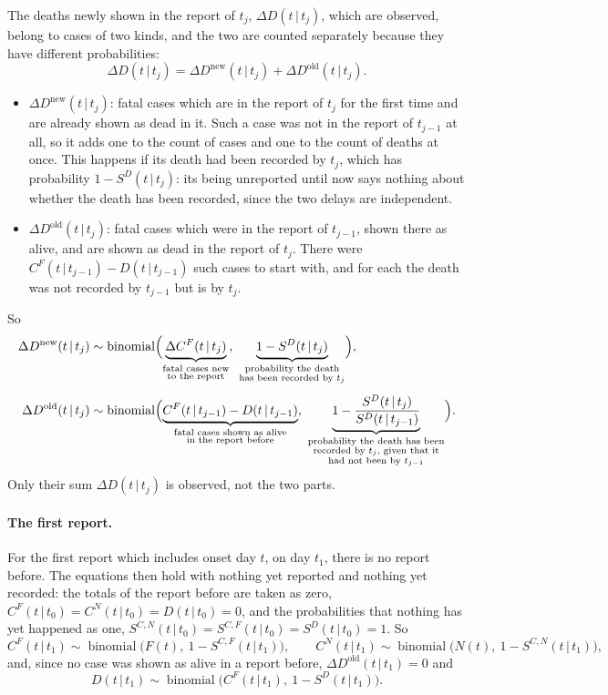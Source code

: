 \documentclass[11pt,a4paper]{article}
\newcommand{\given}{\,|\,}
\newcommand{\bin}{\operatorname{binomial}}
\newcommand{\dnew}{\Delta D^{\mathrm{new}}}
\newcommand{\dold}{\Delta D^{\mathrm{old}}}
\begin{document}
The deaths newly shown in the report of $t_j$, $\Delta D(t\given t_j)$,
which are observed, belong to cases of two kinds, and the two are counted separately because
they have different probabilities:
\[
\Delta D(t\given t_j)=\dnew(t\given t_j)+\dold(t\given t_j).
\]
\begin{itemize}
\item $\dnew(t\given t_j)$: fatal cases which are in the report of $t_j$ for
the first time and are already shown as dead in it. Such a case was not in
the report of $t_{j-1}$ at all, so it adds one to the count of cases and one
to the count of deaths at once. This happens if its death had been recorded
by $t_j$, which has probability $1-S^{D}(t\given t_j)$: its being
unreported until now says nothing about whether the death has been recorded,
since the two delays are independent.
\item $\dold(t\given t_j)$: fatal cases which were in the report of
$t_{j-1}$, shown there as alive, and are shown as dead in the report of
$t_j$. There were $C^{F}(t\given t_{j-1})-D(t\given t_{j-1})$ such cases to
start with, and for each the death was not recorded by $t_{j-1}$ but is by
$t_j$.
\end{itemize}
So
\begin{align}
\dnew(t\given t_j) &\sim\bin\Bigl(
 \underbrace{\Delta C^{F}(t\given t_j)}_{\substack{\text{fatal cases new}\\ \text{to the report}}},\
 \underbrace{1-S^{D}(t\given t_j)}_{\substack{\text{probability the death}\\ \text{has been recorded by } t_j}}
 \Bigr),
 \label{eq:x}\\[1ex]
\dold(t\given t_j) &\sim\bin\Bigl(
 \underbrace{C^{F}(t\given t_{j-1})-D(t\given t_{j-1})}_{\substack{\text{fatal cases shown as alive}\\ \text{in the report before}}},\
 \underbrace{1-\frac{S^{D}(t\given t_j)}{S^{D}(t\given t_{j-1})}}_{\substack{\text{probability the death has been}\\ \text{recorded by } t_j \text{, given that it}\\ \text{had not been by } t_{j-1}}}
 \Bigr).
 \label{eq:y}
\end{align}
Only their sum $\Delta D(t\given t_j)$ is observed, not the two parts.

\paragraph{The first report.} For the first report which includes onset day
$t$, on day $t_1$, there is no report before. The equations then hold with
nothing yet reported and nothing yet recorded: the totals of the report
before are taken as zero,
$C^{F}(t\given t_0)=C^{N}(t\given t_0)=D(t\given t_0)=0$, and the
probabilities that nothing has yet happened as one,
$S^{C,N}(t\given t_0)=S^{C,F}(t\given t_0)=S^{D}(t\given t_0)=1$. So
\[
C^{F}(t\given t_1)\sim\bin\bigl(F(t),\ 1-S^{C,F}(t\given t_1)\bigr),\qquad
C^{N}(t\given t_1)\sim\bin\bigl(N(t),\ 1-S^{C,N}(t\given t_1)\bigr),
\]
and, since no case was shown as alive in a report before,
$\Delta D^{\mathrm{old}}(t\given t_1)=0$ and
\[
D(t\given t_1)\sim\bin\bigl(C^{F}(t\given t_1),\ 1-S^{D}(t\given t_1)\bigr).
\]
\end{document}
